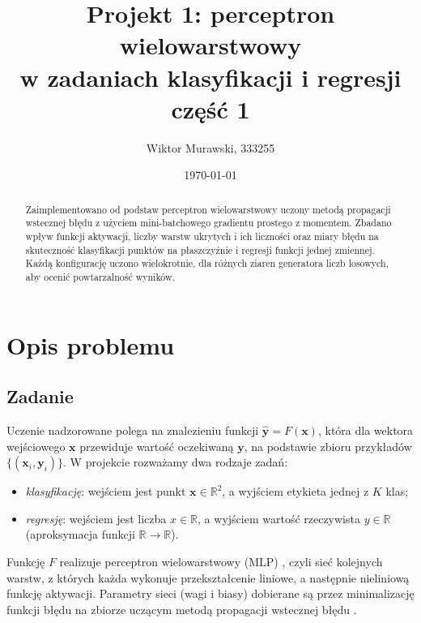 \documentclass[11pt,a4paper]{article}
\title{Projekt 1: perceptron wielowarstwowy\\ w zadaniach klasyfikacji i regresji\\część 1}
\author{Wiktor Murawski, 333255}
\date{\today}
\newcommand{\todo}[1]{\textcolor{red}{[TODO: #1]}}
\newcommand{\mat}[1]{\mathbf{#1}}
\begin{document}
	\maketitle
	
	\begin{abstract}
		Zaimplementowano od podstaw perceptron wielowarstwowy uczony metodą propagacji wstecznej błędu z użyciem mini-batchowego gradientu prostego z momentem. Zbadano wpływ funkcji aktywacji, liczby warstw ukrytych i ich liczności oraz miary błędu na skuteczność klasyfikacji punktów na płaszczyźnie i regresji funkcji jednej zmiennej. Każdą konfigurację uczono wielokrotnie, dla różnych ziaren generatora liczb losowych, aby ocenić powtarzalność wyników. 
	\end{abstract}
	
	\section{Opis problemu}
	
	\subsection{Zadanie}
	Uczenie nadzorowane polega na znalezieniu funkcji $\hat{\mat y}=F(\mat x)$, która dla wektora wejściowego $\mat x$ przewiduje wartość oczekiwaną $\mat y$, na podstawie zbioru przykładów $\{(\mat x_i,\mat y_i)\}$. W projekcie rozważamy dwa rodzaje zadań:
	\begin{itemize}
		\item \emph{klasyfikację}: wejściem jest punkt $\mat x\in\mathbb{R}^2$, a wyjściem etykieta jednej z $K$ klas;
		\item \emph{regresję}: wejściem jest liczba $x\in\mathbb{R}$, a wyjściem wartość rzeczywista $y\in\mathbb{R}$ (aproksymacja funkcji $\mathbb{R}\to\mathbb{R}$).
	\end{itemize}
	Funkcję $F$ realizuje perceptron wielowarstwowy (MLP) \cite{rumelhart1986}, czyli sieć kolejnych warstw, z których każda wykonuje przekształcenie liniowe, a następnie nieliniową funkcję aktywacji. Parametry sieci (wagi i biasy) dobierane są przez minimalizację funkcji błędu na zbiorze uczącym metodą propagacji wstecznej błędu \cite{rumelhart1986}.
	
\end{document}
